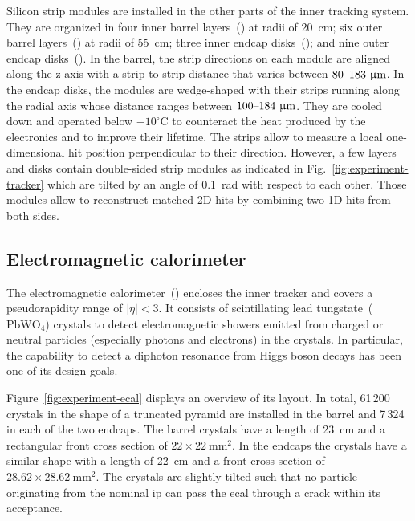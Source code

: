 Silicon strip modules are installed in the other parts of the inner tracking system. They are organized in four inner barrel layers~() at radii of 20~cm; six outer barrel layers~() at radii of 55~cm; three inner endcap disks~(); and nine outer endcap disks~(). In the barrel, the strip directions on each module are aligned along the z-axis with a strip-to-strip distance that varies between $80\text{--}183~\upmu\mathrm{m}$. In the endcap disks, the modules are wedge-shaped with their strips running along the radial axis whose distance ranges between $100\text{--}184~\upmu\mathrm{m}$. They are cooled down and operated below $-10^\circ\mathrm{C}$ to counteract the heat produced by the electronics and to improve their lifetime. The strips allow to measure a local one-dimensional hit position perpendicular to their direction. However, a few layers and disks contain double-sided strip modules as indicated in Fig.~\ref{fig:experiment-tracker} which are tilted by an angle of 0.1~rad with respect to each other. Those modules allow to reconstruct matched 2D hits by combining two 1D hits from both sides. 


\subsection{Electromagnetic calorimeter}

The electromagnetic calorimeter~() encloses the inner tracker and covers a pseudorapidity range of $|\eta|<3$. It consists of scintillating lead tungstate~($\mathrm{PbWO}_{4}$) crystals to detect electromagnetic showers emitted from charged or neutral particles (especially photons and electrons) in the crystals. In particular, the capability to detect a diphoton resonance from Higgs boson decays has been one of its design goals.


Figure~\ref{fig:experiment-ecal} displays an overview of its layout. In total, 61\,200 crystals in the shape of a truncated pyramid are installed in the barrel and 7\,324 in each of the two endcaps. The barrel crystals have a length of 23~cm and a rectangular front cross section of $22\times22~\mathrm{mm}^{2}$. In the endcaps the crystals have a similar shape with a length of 22~cm and a front cross section of $28.62\times28.62~\mathrm{mm}^{2}$. The crystals are slightly tilted such that no particle originating from the nominal \gls{ip} can pass the \gls{ecal} through a crack within its acceptance.

